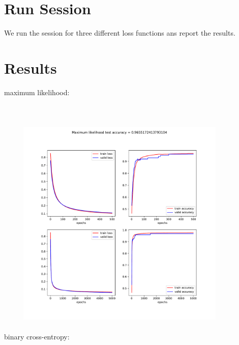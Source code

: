 \documentclass[17pt]{report}
\begin{document}
\section{Run Session}
We run the session for three different loss functions ans report the results.
 
\section{Results}
 
maximum likelihood:\\\\\\\\
\includegraphics[width=12cm, height=10cm]{ML}\\\\
binary cross-entropy:\\\\\\
\end{document}
